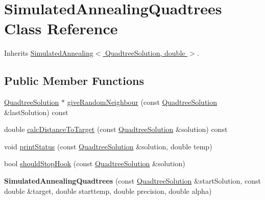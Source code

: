 \hypertarget{class_simulated_annealing_quadtrees}{
\section{SimulatedAnnealingQuadtrees Class Reference}
\label{class_simulated_annealing_quadtrees}
}


Inherits \hyperlink{class_simulated_annealing}{SimulatedAnnealing$<$ QuadtreeSolution, double $>$}.\subsection*{Public Member Functions}
\begin{DoxyCompactItemize}
\item 
\hyperlink{class_quadtree_solution}{QuadtreeSolution} $\ast$ \hyperlink{class_simulated_annealing_quadtrees_abb953a7ff8aa3bed1d6fc99d3a3616ed}{giveRandomNeighbour} (const \hyperlink{class_quadtree_solution}{QuadtreeSolution} \&lastSolution) const 
\item 
double \hyperlink{class_simulated_annealing_quadtrees_ab067118f2ceecfe6b447b5fb7585a763}{calcDistanceToTarget} (const \hyperlink{class_quadtree_solution}{QuadtreeSolution} \&solution) const 
\item 
void \hyperlink{class_simulated_annealing_quadtrees_a4228034780e8cdebe3beb9c89a646373}{printStatus} (const \hyperlink{class_quadtree_solution}{QuadtreeSolution} \&solution, double temp)
\item 
bool \hyperlink{class_simulated_annealing_quadtrees_ae402bb212c241a07477e46348f889fdf}{shouldStopHook} (const \hyperlink{class_quadtree_solution}{QuadtreeSolution} \&solution)
\item 
\hypertarget{class_simulated_annealing_quadtrees_ad5f61461ab5e28b70e8419e0596fa6a4}{
{\bfseries SimulatedAnnealingQuadtrees} (const \hyperlink{class_quadtree_solution}{QuadtreeSolution} \&startSolution, const double \&target, double starttemp, double precision, double alpha)}
\label{class_simulated_annealing_quadtrees_ad5f61461ab5e28b70e8419e0596fa6a4}

\end{DoxyCompactItemize}


